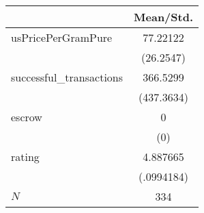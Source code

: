 {
\def\sym#1{\ifmmode^{#1}\else\(^{#1}\)\fi}
\begin{tabular}{l*{1}{c}}
\hline\hline
            &   Mean/Std.\\
\hline
usPricePerGramPure&    77.22122\\
            &   (26.2547)\\
successful\_transactions&    366.5299\\
            &  (437.3634)\\
escrow      &           0\\
            &         (0)\\
rating      &    4.887665\\
            &  (.0994184)\\
\hline
\(N\)       &         334\\
\hline\hline
\end{tabular}
}
